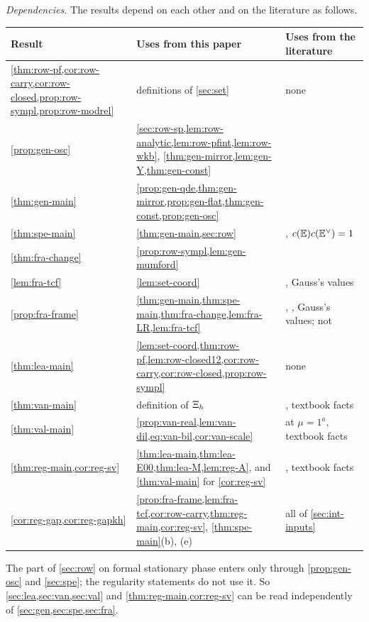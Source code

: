 \emph{Dependencies.} The results depend on each other and on the literature as follows.
\begin{center}
\renewcommand{\arraystretch}{1.15}
\begin{tabular}{>{\raggedright\arraybackslash}p{}>{\raggedright\arraybackslash}p{}>{\raggedright\arraybackslash}p{}}
Result & Uses from this paper & Uses from the literature\\
\hline
\cref{thm:row-pf,cor:row-carry,cor:row-closed,prop:row-sympl,prop:row-modrel} & definitions of \cref{sec:set} & none\\
\cref{prop:gen-osc} & \cref{sec:row-sp,lem:row-analytic,lem:row-pfint,lem:row-wkb}, \cref{thm:gen-mirror,lem:gen-Y,thm:gen-const} & \cite{CCIT15,Pan98,Tel12,PPZ15,GP99,CG07,FP00}\\
\cref{thm:gen-main} & \cref{prop:gen-qde,thm:gen-mirror,prop:gen-flat,thm:gen-const,prop:gen-osc} & \cite{CCIT15,Pan98,Tel12,PPZ15,GP99,CG07,FP00}\\
\cref{thm:spe-main} & \cref{thm:gen-main,sec:row} & \cite{GP99}, $c(\mathbb{E})c(\mathbb{E}^\vee)=1$\\
\cref{thm:fra-change} & \cref{prop:row-sympl,lem:gen-mumford} & \cite{PPZ15,FP00}\\
\cref{lem:fra-tcf} & \cref{lem:set-coord} & \cite{DLMF,Bar10}, Gauss's values\\
\cref{prop:fra-frame} & \cref{thm:gen-main,thm:spe-main,thm:fra-change,lem:fra-LR,lem:fra-tcf} & \cite{CCIT15,Pan98,Tel12,PPZ15,GP99,CG07,FP00}, \cite{DLMF}, Gauss's values; not \cite{Bar10}\\
\cref{thm:lea-main} & \cref{lem:set-coord,thm:row-pf,lem:row-closed12,cor:row-carry,cor:row-closed,prop:row-sympl} & none\\
\cref{thm:van-main} & definition of $\Xi_h$ & \cite{LLZ03}, textbook facts\\
\cref{thm:val-main} & \cref{prop:van-real,lem:van-dil,eq:van-bil,cor:van-scale} & \cite{LLZ03} at $\mu=1^a$, textbook facts\\
\cref{thm:reg-main,cor:reg-sv} & \cref{thm:lea-main,thm:lea-E00,thm:lea-M,lem:reg-A}, and \cref{thm:val-main} for \cref{cor:reg-sv} & \cite{LLZ03}, textbook facts\\
\cref{cor:reg-gap,cor:reg-gapkh} & \cref{prop:fra-frame,lem:fra-tcf,cor:row-carry,thm:reg-main,cor:reg-sv}, \cref{thm:spe-main}(b), (e) & all of \cref{sec:int-inputs}
\end{tabular}
\end{center}
The part of \cref{sec:row} on formal stationary phase enters only through \cref{prop:gen-osc} and \cref{sec:spe}; the regularity statements do not use it. So \cref{sec:lea,sec:van,sec:val} and \cref{thm:reg-main,cor:reg-sv} can be read independently of \cref{sec:gen,sec:spe,sec:fra}.


